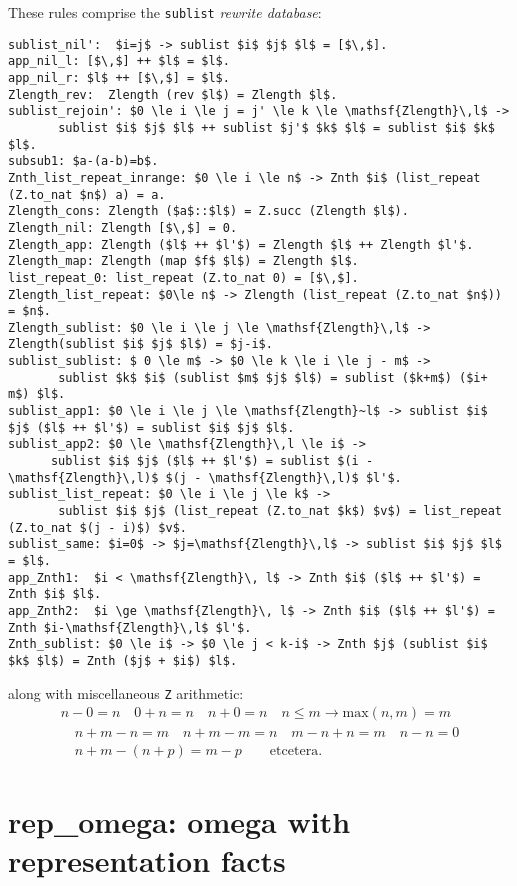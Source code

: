 \documentclass[12pt,fleqn,openany,oneside,showtrims]{memoir}
\begin{document}
These rules comprise the \lstinline{sublist} \emph{rewrite database}:

\begin{lstlisting}
sublist_nil':  $i=j$ -> sublist $i$ $j$ $l$ = [$\,$].
app_nil_l: [$\,$] ++ $l$ = $l$.
app_nil_r: $l$ ++ [$\,$] = $l$.
Zlength_rev:  Zlength (rev $l$) = Zlength $l$.
sublist_rejoin': $0 \le i \le j = j' \le k \le \mathsf{Zlength}\,l$ ->
       sublist $i$ $j$ $l$ ++ sublist $j'$ $k$ $l$ = sublist $i$ $k$ $l$.
subsub1: $a-(a-b)=b$.
Znth_list_repeat_inrange: $0 \le i \le n$ -> Znth $i$ (list_repeat (Z.to_nat $n$) a) = a.
Zlength_cons: Zlength ($a$::$l$) = Z.succ (Zlength $l$).
Zlength_nil: Zlength [$\,$] = 0.
Zlength_app: Zlength ($l$ ++ $l'$) = Zlength $l$ ++ Zlength $l'$.
Zlength_map: Zlength (map $f$ $l$) = Zlength $l$.
list_repeat_0: list_repeat (Z.to_nat 0) = [$\,$].
Zlength_list_repeat: $0\le n$ -> Zlength (list_repeat (Z.to_nat $n$)) = $n$.
Zlength_sublist: $0 \le i \le j \le \mathsf{Zlength}\,l$ -> Zlength(sublist $i$ $j$ $l$) = $j-i$.
sublist_sublist: $ 0 \le m$ -> $0 \le k \le i \le j - m$ ->
       sublist $k$ $i$ (sublist $m$ $j$ $l$) = sublist ($k+m$) ($i+ m$) $l$.
sublist_app1: $0 \le i \le j \le \mathsf{Zlength}~l$ -> sublist $i$ $j$ ($l$ ++ $l'$) = sublist $i$ $j$ $l$.
sublist_app2: $0 \le \mathsf{Zlength}\,l \le i$ ->
      sublist $i$ $j$ ($l$ ++ $l'$) = sublist $(i - \mathsf{Zlength}\,l)$ $(j - \mathsf{Zlength}\,l)$ $l'$.
sublist_list_repeat: $0 \le i \le j \le k$ ->
       sublist $i$ $j$ (list_repeat (Z.to_nat $k$) $v$) = list_repeat (Z.to_nat $(j - i)$) $v$.
sublist_same: $i=0$ -> $j=\mathsf{Zlength}\,l$ -> sublist $i$ $j$ $l$ = $l$.
app_Znth1:  $i < \mathsf{Zlength}\, l$ -> Znth $i$ ($l$ ++ $l'$) = Znth $i$ $l$.
app_Znth2:  $i \ge \mathsf{Zlength}\, l$ -> Znth $i$ ($l$ ++ $l'$) = Znth $i-\mathsf{Zlength}\,l$ $l'$.
Znth_sublist: $0 \le i$ -> $0 \le j < k-i$ -> Znth $j$ (sublist $i$ $k$ $l$) = Znth ($j$ + $i$) $l$.
\end{lstlisting}
\vspace{-\baselineskip}
along with miscellaneous \lstinline{Z} arithmetic:
\[
\begin{array}{c}
n-0=n \quad 0+n=n \quad n+0=n \quad n \le m \rightarrow \mathrm{max}(n,m) = m\\
\quad n + m - n = m
\quad n + m - m = n
\quad m - n + n = m
\quad n-n=0\\
\quad n + m - (n + p) = m - p \qquad \mathrm{et cetera.}
\end{array}
\]

\chapter{\textsf{rep\_omega}: omega with representation facts}
\label{refcard:rep-omega}
\end{document}
